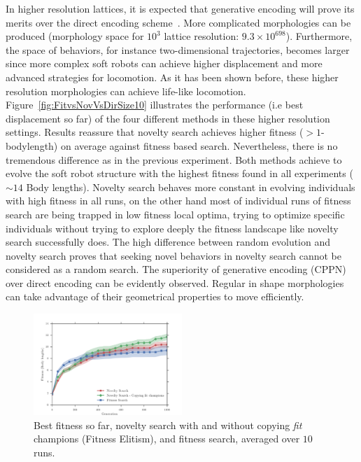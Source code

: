\documentclass{sig-alternate}
\begin{document}
In higher resolution lattices, it is expected that generative encoding will prove its merits over the direct encoding scheme~\cite{cheney2013unshackling,stanley2007compositional}. More complicated morphologies can be produced (morphology space for $10^3$ lattice resolution: $9.3 \times 10^{698}$). Furthermore, the space of behaviors, for instance two-dimensional trajectories, becomes larger since more complex soft robots can achieve higher displacement and more advanced strategies for locomotion. As it has been shown before, these higher resolution morphologies can achieve life-like locomotion. Figure~\ref{fig:FitvsNovVsDirSize10} illustrates the performance (i.e best displacement so far) of the four different methods in these higher resolution settings. Results reassure that novelty search achieves higher fitness ($> 1$-bodylength) on average against fitness based search. Nevertheless, there is no tremendous difference as in the previous experiment. Both methods achieve to evolve the soft robot structure with the highest fitness found in all experiments ($\sim 14$ Body lengths). Novelty search behaves more constant in evolving individuals with high fitness in all runs, on the other hand most of individual runs of fitness search are being trapped in low fitness local optima, trying to optimize specific individuals without trying to explore deeply the fitness landscape like novelty search successfully does. The high difference between random evolution and novelty search proves that seeking novel behaviors in novelty search cannot be considered as a random search. The superiority of generative encoding (CPPN) over direct encoding can be evidently observed. Regular in shape morphologies can take advantage of their geometrical properties to move efficiently.

\begin{figure}[t!]
\centering
\includegraphics[width=0.5\textwidth]{../Figures/Results/CopyFitChampions10.pdf}
\caption{Best fitness so far, novelty search with and without copying \emph{fit} champions (Fitness Elitism), and fitness search, averaged over $10$ runs.}
\label{fig:CopyFitChampions10}
\vspace{-15pt}
\end{figure}
\end{document}
